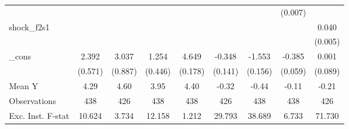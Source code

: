 {\begin{tabular}{l*{8}{c}}
            &                     &                     &                     &                     &                     &                     &     (0.007)         &                     \\
\addlinespace
shock\_f2s1  &                     &                     &                     &                     &                     &                     &                     &       0.040\sym{***}\\
            &                     &                     &                     &                     &                     &                     &                     &     (0.005)         \\
\addlinespace
\_cons      &       2.392\sym{***}&       3.037\sym{***}&       1.254\sym{**} &       4.649\sym{***}&      -0.348\sym{**} &      -1.553\sym{***}&      -0.385\sym{***}&       0.001         \\
            &     (0.571)         &     (0.887)         &     (0.446)         &     (0.178)         &     (0.141)         &     (0.156)         &     (0.059)         &     (0.089)         \\
\midrule
Mean Y      &        4.29         &        4.60         &        3.95         &        4.40         &       -0.32         &       -0.44         &       -0.11         &       -0.21         \\
Observations&         438         &         426         &         438         &         438         &         426         &         438         &         438         &         426         \\
Exc. Inst. F-stat&      10.624         &       3.734         &      12.158         &       1.212         &      29.793         &      38.689         &       6.733         &      71.730         \\
\bottomrule
\end{tabular}
}
